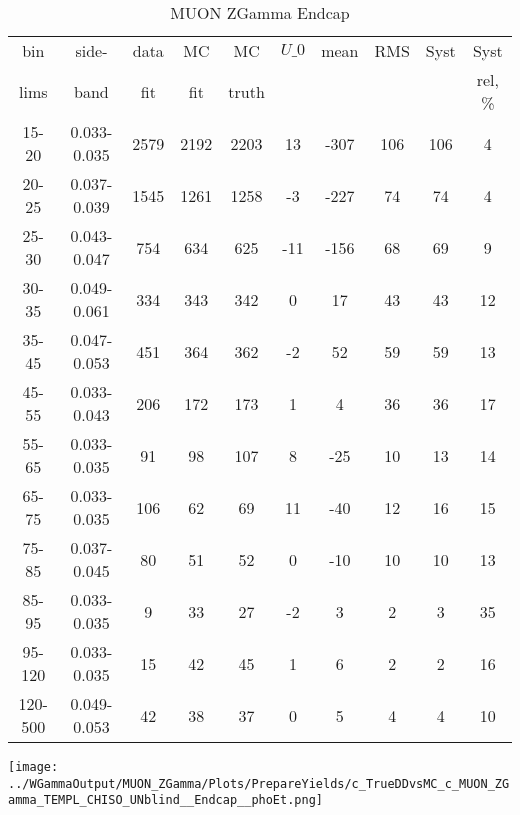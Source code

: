 \documentclass{beamer}
\begin{document}
\begin{frame}
{
\begin{table}[h]
  	\tiny
  \begin{center}
  \caption{MUON ZGamma Endcap}
  \begin{tabular}{|c|c|c|c|c|c|c|c|c|c|}
    bin & side- & data & MC & MC    & $U\_{0}$ & mean & RMS & Syst & Syst \\ 
    lims & band & fit & fit & truth &       &      &     &      & rel, \% \\ \hline
    15-20 & 0.033-0.035 & 2579 & 2192 & 2203 & 13 & -307 & 106 & 106 & 4  \\ \hline
    20-25 & 0.037-0.039 & 1545 & 1261 & 1258 & -3 & -227 & 74 & 74 & 4  \\ \hline
    25-30 & 0.043-0.047 & 754 & 634 & 625 & -11 & -156 & 68 & 69 & 9  \\ \hline
    30-35 & 0.049-0.061 & 334 & 343 & 342 & 0 & 17 & 43 & 43 & 12  \\ \hline
    35-45 & 0.047-0.053 & 451 & 364 & 362 & -2 & 52 & 59 & 59 & 13  \\ \hline
    45-55 & 0.033-0.043 & 206 & 172 & 173 & 1 & 4 & 36 & 36 & 17  \\ \hline
    55-65 & 0.033-0.035 & 91 & 98 & 107 & 8 & -25 & 10 & 13 & 14  \\ \hline
    65-75 & 0.033-0.035 & 106 & 62 & 69 & 11 & -40 & 12 & 16 & 15  \\ \hline
    75-85 & 0.037-0.045 & 80 & 51 & 52 & 0 & -10 & 10 & 10 & 13  \\ \hline
    85-95 & 0.033-0.035 & 9 & 33 & 27 & -2 & 3 & 2 & 3 & 35  \\ \hline
    95-120 & 0.033-0.035 & 15 & 42 & 45 & 1 & 6 & 2 & 2 & 16  \\ \hline
    120-500 & 0.049-0.053 & 42 & 38 & 37 & 0 & 5 & 4 & 4 & 10  \\ \hline
  \end{tabular}
  \label{tab:systSbVar_Meth1_MUON_ZGamma_Endcap}
  \end{center}
\end{table}

\texttt{[image: ../WGammaOutput/MUON\_ZGamma/Plots/PrepareYields/c\_TrueDDvsMC\_c\_MUON\_ZGamma\_TEMPL\_CHISO\_UNblind\_\_Endcap\_\_phoEt.png]}
}
\end{frame}
\end{document}
